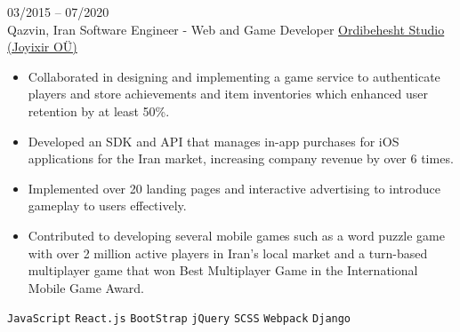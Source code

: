 \entry
{03/2015 -- 07/2020 \\ Qazvin, Iran}
{Software Engineer - Web and Game Developer}
{\href{https://www.joyixir.com/}{Ordibehesht Studio  (Joyixir OÜ)}}
{\vspace{-10pt}
    \begin{itemize}[noitemsep,topsep=0pt,parsep=0pt,partopsep=0pt, leftmargin=-1pt]
        \item Collaborated in designing and implementing a game service to authenticate players and store achievements and item inventories which enhanced user retention by at least 50\%.
        \item Developed an SDK and API that manages in-app purchases for iOS applications for the Iran market, increasing company revenue by over 6 times.
        \item Implemented over 20 landing pages and interactive advertising to introduce gameplay to users effectively.
        \item Contributed to developing several mobile games such as a word puzzle game with over 2 million active players in Iran's local market and a turn-based multiplayer game that won Best Multiplayer Game in the International Mobile Game Award.
    \end{itemize}
    \texttt{JavaScript} \slashsep \texttt{React.js} \slashsep \texttt{BootStrap} \slashsep \texttt{jQuery} \slashsep \texttt{SCSS} \slashsep \texttt{Webpack} \slashsep \texttt{Django}
}
